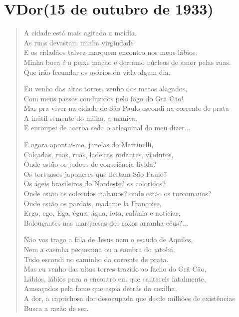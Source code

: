 \pagebreak
{}
\section{V\break Dor\break (15 de outubro de 1933)}

\begin{verse}
A cidade está mais agitada a meidia.\\
As ruas devastam minha virgindade\\
E os cidadãos talvez marquem encontro nos meus lábios.\\
Minha boca é o peixe macho e derramo núcleos de amor pelas ruas.\\
Que irão fecundar os ovários da vida algum dia.

Eu venho das altas torres, venho dos matos alagados,\\
Com meus passos conduzidos pelo fogo do Grã Cão!\\
Mas pra viver na cidade de São Paulo escondi na corrente de prata\\
A inútil semente do milho, a maniva,\\
E enroupei de acerba seda o arlequinal do meu dizer...

E agora apontai-me, janelas do Martinelli,\\
Calçadas, ruas, ruas, ladeiras rodantes, viadutos,\\
Onde estão os judeus de consciência lívida?\\
Os tortuosos japoneses que flertam São Paulo?\\
Os ágeis brasileiros do Nordeste? os coloridos?\\
Onde estão os coloridos italianos? onde estão os turcomanos?\\
Onde estão os pardais, madame la Françoise,\\
Ergo, ego, Ega, égua, água, iota, calúnia e notícias,\\
Balouçantes nas marquesas dos roxos arranha-céus?...

Não vos trago a fala de Jesus nem o escudo de Aquiles,\\
Nem a casinha pequenina ou a sombra do jatobá.\\
Tudo escondi no caminho da corrente de prata.\\
Mas eu venho das altas torres trazido ao facho do Grã Cão,\\
Lábios, lábios para o encontro em que cantareis fatalmente,\\
Ameaçados pela fome que espia detrás da coxilha,\\
A dor, a caprichosa dor desocupada que desde milhões de existências\\
Busca a razão de ser.
\end{verse}


